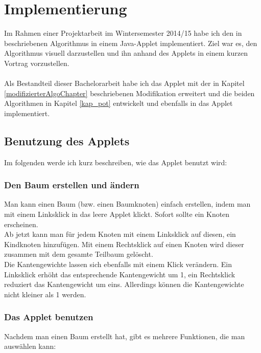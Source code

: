 \section{Implementierung}

Im Rahmen einer Projektarbeit im Wintersemester 2014/15 habe ich den in \cite{cima_paper} beschriebenen Algorithmus in einem Java-Applet implementiert. Ziel war es, den Algorithmus visuell darzustellen und ihn anhand des Applets in einem kurzen Vortrag vorzustellen.
\\
\\
Als Bestandteil dieser Bachelorarbeit habe ich das Applet mit der in Kapitel \ref{modifizierterAlgoChapter} beschriebenen Modifikation erweitert und die beiden Algorithmen in Kapitel \ref{kap_pot} entwickelt und ebenfalls in das Applet implementiert.


\subsection{Benutzung des Applets}

Im folgenden werde ich kurz beschreiben, wie das Applet benutzt wird:

\subsubsection*{Den Baum erstellen und ändern}

Man kann einen Baum (bzw. einen Baumknoten) einfach erstellen, indem man mit einem Linksklick in das leere Applet klickt. Sofort sollte ein Knoten erscheinen.\\
Ab jetzt kann man für jedem Knoten mit einem Linksklick auf diesen, ein Kindknoten hinzufügen. Mit einem Rechtsklick auf einen Knoten wird dieser zusammen mit dem gesamte Teilbaum gelöscht.\\
Die Kantengewichte lassen sich ebenfalls mit einem Klick verändern. Ein Linksklick erhöht das entsprechende Kantengewicht um 1, ein Rechtsklick reduziert das Kantengewicht um eins. Allerdings können die Kantengewichte nicht kleiner als 1 werden.


\subsubsection*{Das Applet benutzen}

Nachdem man einen Baum erstellt hat, gibt es mehrere Funktionen, die man auswählen kann:\\

